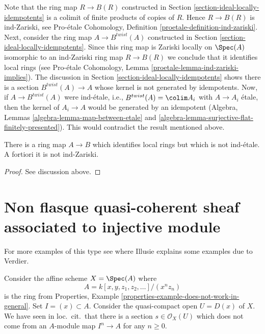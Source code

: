 \noindent
Note that the ring map $R \to B(R)$ constructed in
Section \ref{section-ideal-locally-idempotents} is
a colimit of finite products of copies of $R$. Hence $R \to B(R)$
is ind-Zariski, see
Pro-\'etale Cohomology, Definition \ref{proetale-definition-ind-zariski}.
Next, consider the ring map $A \to B^{twist}(A)$
constructed in Section \ref{section-ideal-locally-idempotents}.
Since this ring map is Zariski locally on $\Spec(A)$ isomorphic to an
ind-Zariski ring map $R \to B(R)$ we conclude that it identifies local rings
(see Pro-\'etale Cohomology, Lemma \ref{proetale-lemma-ind-zariski-implies}).
The discussion in Section \ref{section-ideal-locally-idempotents}
shows there is a section
$B^{twist}(A) \to A$ whose kernel is not generated by idempotents.
Now, if $A \to B^{twist}(A)$ were ind-\'etale, i.e.,
$B^{twist}(A) = \colim A_i$ with $A \to A_i$ \'etale,
then the kernel of $A_i \to A$ would be generated by an idempotent
(Algebra, Lemmas \ref{algebra-lemma-map-between-etale} and
\ref{algebra-lemma-surjective-flat-finitely-presented}).
This would contradict the result mentioned above.

\begin{lemma}
\label{lemma-not-ind-etale}
There is a ring map $A \to B$ which identifies local rings but
which is not ind-\'etale. A fortiori it is not ind-Zariski.
\end{lemma}

\begin{proof}
See discussion above.
\end{proof}




\section{Non flasque quasi-coherent sheaf associated to injective module}
\label{section-nonflasque}

\noindent
For more examples of this type see \cite[Expos\'e II, Appendix I]{SGA6}
where Illusie explains some examples due to Verdier.

\medskip\noindent
Consider the affine scheme $X = \Spec(A)$ where
$$
A = k[x, y, z_1, z_2, \ldots]/(x^nz_n)
$$
is the ring from
Properties, Example \ref{properties-example-does-not-work-in-general}.
Set $I = (x) \subset A$. Consider the quasi-compact open $U = D(x)$ of $X$.
We have seen in loc.\ cit.\ that there is a section
$s \in \mathcal{O}_X(U)$ which does not come from an $A$-module
map $I^n \to A$ for any $n \geq 0$.

